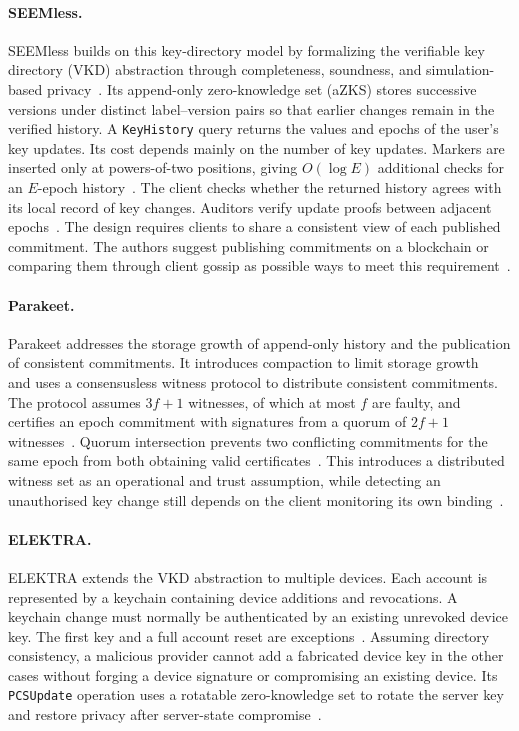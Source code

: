 \paragraph{SEEMless.}
SEEMless builds on this key-directory model by formalizing the verifiable key directory (VKD)
abstraction through completeness, soundness, and simulation-based
privacy~\cite[Section~2]{chase2019seemless}. Its append-only zero-knowledge set (aZKS) stores
successive versions under distinct label--version pairs so that earlier changes remain in the
verified history. A \texttt{KeyHistory} query returns the values and epochs of the user's key
updates. Its cost depends mainly on the number of key updates. Markers are inserted only at
powers-of-two positions, giving $O(\log E)$ additional checks for an $E$-epoch
history~\cite[Sections~4.2--4.3]{chase2019seemless}. The client checks whether the returned history
agrees with its local record of key changes. Auditors verify update proofs between
adjacent epochs~\cite[Section~4.3]{chase2019seemless}. The design requires clients to share a
consistent view of each published commitment. The authors suggest publishing commitments on a
blockchain or comparing them through client gossip as possible ways to meet this
requirement~\cite[Section~2.1]{chase2019seemless}.

\paragraph{Parakeet.}
Parakeet addresses the storage growth of append-only history and the publication of consistent
commitments. It introduces compaction to limit storage
growth~\cite[Sections~III-C and~IV]{malvai2023parakeet} and uses a consensusless witness protocol
to distribute consistent commitments. The protocol assumes $3f+1$ witnesses, of which at most $f$
are faulty, and certifies an epoch commitment with signatures from a quorum of $2f+1$
witnesses~\cite[Sections~II-A and~V]{malvai2023parakeet}. Quorum intersection prevents two
conflicting commitments for the same epoch from both obtaining valid
certificates~\cite[Section~V-B]{malvai2023parakeet}. This introduces a distributed witness set as
an operational and trust assumption, while detecting an unauthorised key change still depends on
the client monitoring its own binding~\cite{malvai2023parakeet}.

\paragraph{ELEKTRA.}
ELEKTRA extends the VKD abstraction to multiple devices. Each account is represented by a keychain
containing device additions and revocations. A keychain change must normally be authenticated by
an existing unrevoked device key. The first key and a full account reset are
exceptions~\cite[Sections~1, 2.1, and~2.2]{len2023elektra}. Assuming directory consistency, a
malicious provider cannot add a fabricated device key in the other cases without forging a device
signature or compromising an existing device. Its \texttt{PCSUpdate}
operation uses a rotatable zero-knowledge set to rotate the server key and restore privacy after
server-state compromise~\cite[Sections~1 and~3.1]{len2023elektra}.

